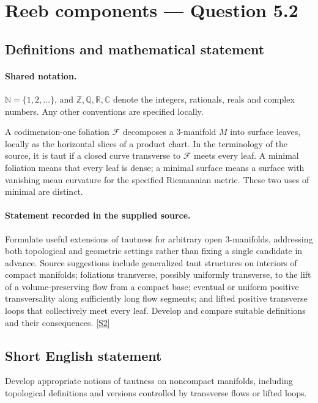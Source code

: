 \documentclass[11pt]{article}
\newcommand{\sref}[2]{\hyperlink{source:#1:#2}{[S#2]}}
\begin{document}
\section{Reeb components — Question 5.2}\label{statement}

\subsection{Definitions and mathematical statement}

\paragraph{Shared notation.}$\mathbb N=\{1,2,\ldots\}$, and $\mathbb Z,\mathbb Q,\mathbb R,\mathbb C$ denote the integers, rationals, reals and complex numbers. Any other conventions are specified locally.


A codimension-one foliation $\mathcal F$ decomposes a $3$-manifold $M$ into surface leaves, locally as the horizontal slices of a product chart. In the terminology of the source, it is taut if a closed curve transverse to $\mathcal F$ meets every leaf. A minimal foliation means that every leaf is dense; a minimal surface means a surface with vanishing mean curvature for the specified Riemannian metric. These two uses of minimal are distinct.
\paragraph{Statement recorded in the supplied source.}
Formulate useful extensions of tautness for arbitrary open $3$-manifolds, addressing both topological and geometric settings rather than fixing a single candidate in advance. Source suggestions include generalized taut structures on interiors of compact manifolds; foliations transverse, possibly uniformly transverse, to the lift of a volume-preserving flow from a compact base; eventual or uniform positive transversality along sufficiently long flow segments; and lifted positive transverse loops that collectively meet every leaf. Develop and compare suitable definitions and their consequences. \sref{statement}{2}
\subsection{Short English statement}
Develop appropriate notions of tautness on noncompact manifolds, including topological definitions and versions controlled by transverse flows or lifted loops.
\end{document}
